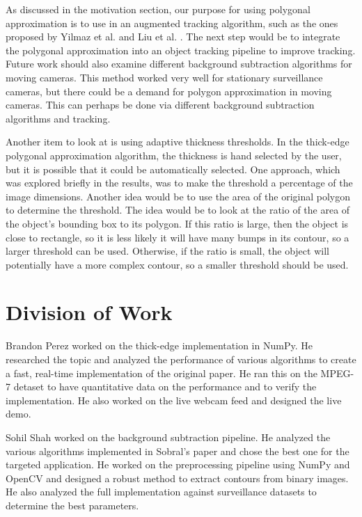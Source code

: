\documentclass[10pt,twocolumn,letterpaper]{article}
\begin{document}
As discussed in the motivation section, our purpose for using polygonal approximation is to use in an augmented tracking
algorithm, such as the ones proposed by Yilmaz et al. \cite{Yilmaz2004} and Liu et al. \cite{Liu2006}. The next step
would be to integrate the polygonal approximation into an object tracking pipeline to improve tracking. Future work
should also examine different background subtraction algorithms for moving cameras. This method worked very well for
stationary surveillance cameras, but there could be a demand for polygon approximation in moving cameras. This can
perhaps be done via different background subtraction algorithms and tracking.

Another item to look at is using adaptive thickness thresholds. In the thick-edge polygonal approximation algorithm, the
thickness is hand selected by the user, but it is possible that it could be automatically selected. One approach, which
was explored briefly in the results, was to make the threshold a percentage of the image dimensions. Another idea would
be to use the area of the original polygon to determine the threshold. The idea would be to look at the ratio of the
area of the object's bounding box to its polygon. If this ratio is large, then the object is close to rectangle, so it
is less likely it will have many bumps in its contour, so a larger threshold can be used. Otherwise, if the ratio is
small, the object will potentially have a more complex contour, so a smaller threshold should be used.


\section{Division of Work}

Brandon Perez worked on the thick-edge implementation in NumPy. He researched the topic and analyzed the performance of
various algorithms to create a fast, real-time implementation of the original paper. He ran this on the MPEG-7 detaset
to have quantitative data on the performance and to verify the implementation. He also worked on the live webcam feed
and designed the live demo.

Sohil Shah worked on the background subtraction pipeline. He analyzed the various algorithms implemented in Sobral's
paper and chose the best one for the targeted application. He worked on the preprocessing pipeline using NumPy and
OpenCV and designed a robust method to extract contours from binary images. He also analyzed the full implementation
against surveillance datasets to determine the best parameters.


{\small
	
	
}
\end{document}
